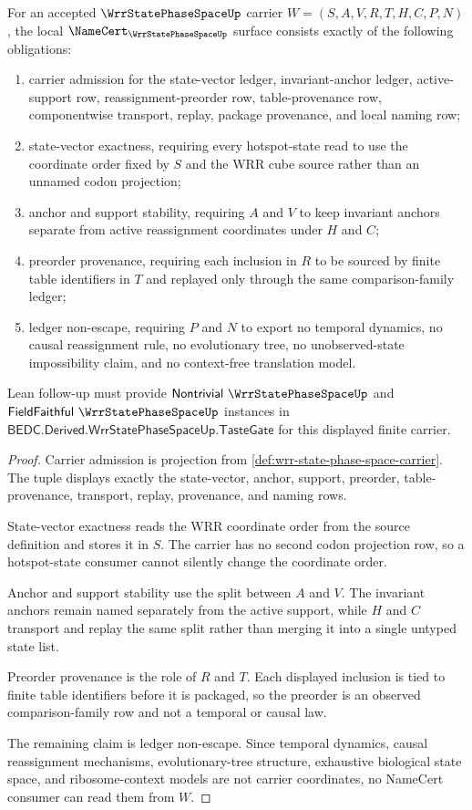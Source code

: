 \begin{theorem}
\label{thm:wrr-state-phase-space-namecert-obligations}
For an accepted $\WrrStatePhaseSpaceUp$ carrier $W=(S,A,V,R,T,H,C,P,N)$, the local $\NameCert_{\WrrStatePhaseSpaceUp}$ surface consists exactly of the following obligations:
\begin{enumerate}
\item carrier admission for the state-vector ledger, invariant-anchor ledger, active-support row, reassignment-preorder row, table-provenance row, componentwise transport, replay, package provenance, and local naming row;
\item state-vector exactness, requiring every hotspot-state read to use the coordinate order fixed by $S$ and the WRR cube source rather than an unnamed codon projection;
\item anchor and support stability, requiring $A$ and $V$ to keep invariant anchors separate from active reassignment coordinates under $H$ and $C$;
\item preorder provenance, requiring each inclusion in $R$ to be sourced by finite table identifiers in $T$ and replayed only through the same comparison-family ledger;
\item ledger non-escape, requiring $P$ and $N$ to export no temporal dynamics, no causal reassignment rule, no evolutionary tree, no unobserved-state impossibility claim, and no context-free translation model.
\end{enumerate}
Lean follow-up must provide $\mathsf{Nontrivial}\ \WrrStatePhaseSpaceUp$ and $\mathsf{FieldFaithful}\ \WrrStatePhaseSpaceUp$ instances in $\mathsf{BEDC.Derived.WrrStatePhaseSpaceUp.TasteGate}$ for this displayed finite carrier.
\end{theorem}
\begin{proof}
Carrier admission is projection from \autoref{def:wrr-state-phase-space-carrier}. The tuple displays exactly the state-vector, anchor, support, preorder, table-provenance, transport, replay, provenance, and naming rows.

State-vector exactness reads the WRR coordinate order from the source definition and stores it in $S$. The carrier has no second codon projection row, so a hotspot-state consumer cannot silently change the coordinate order.

Anchor and support stability use the split between $A$ and $V$. The invariant anchors remain named separately from the active support, while $H$ and $C$ transport and replay the same split rather than merging it into a single untyped state list.

Preorder provenance is the role of $R$ and $T$. Each displayed inclusion is tied to finite table identifiers before it is packaged, so the preorder is an observed comparison-family row and not a temporal or causal law.

The remaining claim is ledger non-escape. Since temporal dynamics, causal reassignment mechanisms, evolutionary-tree structure, exhaustive biological state space, and ribosome-context models are not carrier coordinates, no NameCert consumer can read them from $W$.
\end{proof}
